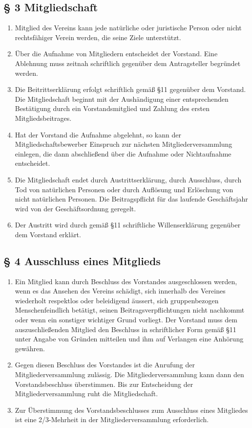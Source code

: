﻿\documentclass[10pt,a4paper]{scrartcl}
\begin{document}
\subsection*{§ 3 Mitgliedschaft}
\begin{enumerate}
	\item Mitglied des Vereins kann jede natürliche oder juristische Person oder
		nicht rechts\-fähiger Verein werden, die seine Ziele unterstützt.
        \item Über die Aufnahme von Mitgliedern entscheidet der Vorstand. Eine Ablehnung muss zeitnah schriftlich gegenüber dem Antragsteller begründet werden.
	\item Die Beitrittserklärung erfolgt schriftlich gemäß §11 gegenüber dem Vorstand. Die
		Mitgliedschaft beginnt mit der Aushändigung einer entsprechenden Bestätigung durch
                ein Vorstandsmitglied und Zahlung des ersten Mitgliedsbeitrages.
	\item Hat der Vorstand die Aufnahme abgelehnt, so kann der Mitgliedschaftsbewerber Einspruch
		zur nächsten Mitgliederversammlung einlegen, die dann abschließend über die Aufnahme
		oder Nichtaufnahme entscheidet.
	\item Die Mitgliedschaft endet durch Austrittserklärung, durch Ausschluss, durch Tod von
		natür\-li\-chen Personen oder durch Auflösung und Erlöschung von nicht
		natür\-lichen Personen.
		Die Beitragspflicht für das laufende Geschäftsjahr wird von der Geschäftsordnung
		geregelt.
	\item Der Austritt wird durch gemäß §11 schriftliche Willenserklärung gegenüber dem Vorstand
		erklärt.
\end{enumerate}
%
%
\subsection*{§ 4 Ausschluss eines Mitglieds }
\begin{enumerate}
	\item Ein Mitglied kann durch Beschluss des Vorstandes ausgeschlossen werden, wenn es das
                Ansehen des Vereins schädigt, sich innerhalb des Vereines wiederholt respektlos oder 
                beleidigend äussert, sich gruppenbezogen Menschenfeindlich betätigt, seinen Beitragsverpflichtungen nicht nachkommt oder 
		wenn ein sonstiger wichtiger Grund vorliegt. Der Vorstand muss dem auszuschließenden
		Mitglied den Beschluss in schriftlicher Form gemäß §11 unter Angabe von Gründen
		mitteilen und ihm auf Verlangen eine Anhörung gewähren.
        \item Gegen diesen Beschluss des Vorstandes ist die Anrufung der Mitgliederversammlung zu\-läs\-sig. Die Mitgliederversammlung kann dann den Vorstandsbeschluss überstimmen.
				Bis zur Entscheidung der Mitgliederversammlung ruht die Mitgliedschaft.
		\item Zur Überstimmung des Vorstandsbeschlusses zum Ausschluss eines Mitgliedes ist eine 2/3-Mehrheit in der Mitgliederversammlung erforderlich.
	
\end{enumerate}
%
%
\end{document}

